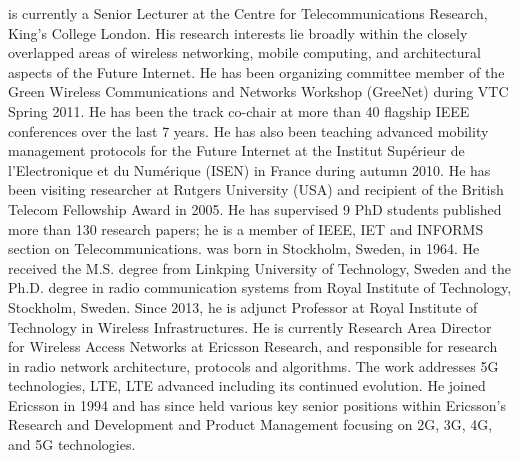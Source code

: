 \documentclass[journal]{IEEEtran}
\renewenvironment{IEEEbiography}[1]
  {\IEEEbiographynophoto{#1}}
  {\endIEEEbiographynophoto}
\begin{document}
\begin{IEEEbiography}{Vasilis Friderikos} is currently a Senior Lecturer at the Centre for Telecommunications Research, King’s College London. His research interests lie broadly within the closely overlapped areas of wireless networking, mobile computing, and architectural aspects of the Future Internet. He has been organizing committee member of the Green Wireless Communications and Networks Workshop (GreeNet) during VTC Spring 2011. He has been the track co-chair at more than 40 flagship IEEE conferences  over the last 7 years. He has also been teaching advanced mobility management protocols for the Future Internet at the Institut Supérieur de l’Electronique et du Numérique (ISEN) in France during autumn 2010.  He has been visiting researcher at  Rutgers University (USA) and recipient of the British Telecom Fellowship Award in 2005. He has supervised 9 PhD students published more than 130 research papers; he is a member of IEEE, IET and INFORMS section on Telecommunications.
\end{IEEEbiography}
\begin{IEEEbiography}{Magnus Frodigh} was born in Stockholm, Sweden,
in 1964. He received the M.S. degree from Linkping University of Technology, Sweden and the Ph.D. degree in radio communication systems from Royal Institute of Technology, Stockholm, Sweden. Since 2013, he is adjunct Professor at Royal Institute of Technology in Wireless Infrastructures. He is currently Research Area Director for Wireless Access Networks at Ericsson Research, and responsible for research in radio network architecture, protocols and algorithms. The work addresses 5G technologies, LTE, LTE advanced including its continued evolution. He joined Ericsson in 1994 and has since held various key senior positions within Ericsson’s Research and Development and Product Management focusing on 2G, 3G, 4G, and 5G technologies.
\end{IEEEbiography}
\end{document}
